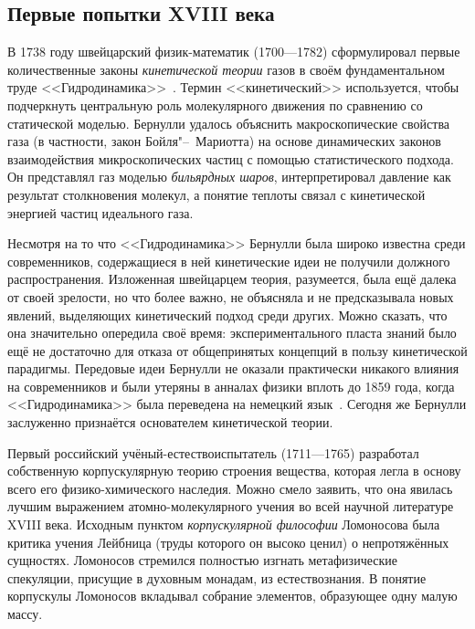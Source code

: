 \documentclass[a4paper, 12pt, oneside]{article} %
\begin{document}
\subsection{Первые попытки XVIII века}

В 1738 году швейцарский физик-математик 
(1700---1782) сформулировал первые количественные законы
\emph{кинетической теории} газов в своём фундаментальном труде
<<Гидродинамика>>~\cite{bernulli1959hydro}. Термин <<кинетический>>
используется, чтобы подчеркнуть центральную роль молекулярного движения
по сравнению со статической моделью. Бернулли удалось объяснить
макроскопические свойства газа (в частности, закон Бойля"--~Мариотта) на
основе динамических законов взаимодействия микроскопических частиц с
помощью статистического подхода. Он представлял газ моделью
\emph{бильярдных шаров}, интерпретировал давление как результат
столкновения молекул, а понятие теплоты связал с кинетической энергией
частиц идеального газа.

Несмотря на то что <<Гидродинамика>> Бернулли была широко известна среди
современников, содержащиеся в ней кинетические идеи не получили должного
распространения. Изложенная швейцарцем теория, разумеется, была ещё
далека от своей зрелости, но что более важно, не объясняла и не
предсказывала новых явлений, выделяющих кинетический подход среди
других. Можно сказать, что она значительно опередила своё время:
экспериментального пласта знаний было ещё не достаточно для отказа от
общепринятых концепций в пользу кинетической парадигмы. Передовые идеи
Бернулли не оказали практически никакого влияния на современников и были
утеряны в анналах физики вплоть до 1859 года, когда <<Гидродинамика>>
была переведена на немецкий язык~\cite{bernoulli1859daniel}. Сегодня же
Бернулли заслуженно признаётся основателем кинетической теории.

Первый российский учёный-естествоиспытатель 
(1711---1765) разработал собственную корпускулярную теорию строения
вещества, которая легла в основу всего его физико-химического наследия.
Можно смело заявить, что она явилась лучшим выражением
атомно-молекулярного учения во всей научной литературе XVIII века.
Исходным пунктом \emph{корпускулярной философии} Ломоносова была критика
учения Лейбница (труды которого он высоко ценил) о непротяжённых
сущностях. Ломоносов стремился полностью изгнать метафизические
спекуляции, присущие в духовным монадам, из естествознания. В понятие
корпускулы Ломоносов вкладывал собрание элементов, образующее одну малую
массу.
\end{document}
